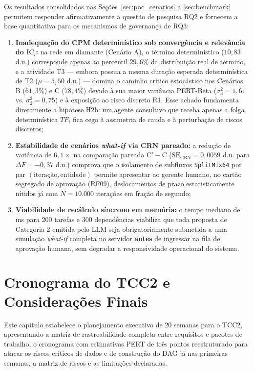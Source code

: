 \documentclass[12pt,openany,oneside,a4paper,english,brazilian,sumario=tradicional]{abntex2}
\newcommand{\IC}{\mathrm{IC}}
\begin{document}
Os resultados consolidados nas Seções~\ref{sec:poc_cenarios} a \ref{sec:benchmark} permitem responder afirmativamente à questão de pesquisa RQ2 e fornecem a base quantitativa para os mecanismos de governança de RQ3:
\begin{enumerate}
  \item \textbf{Inadequação do CPM determinístico sob convergência e relevância do $\IC_i$:} na rede em diamante (Cenário A), o término determinístico ($10{,}83$ d.u.) corresponde apenas ao percentil $29{,}6\%$ da distribuição real de término, e a atividade T3 — embora possua a mesma duração esperada determinística de T2 ($\mu=5{,}50$ d.u.) — domina o caminho crítico estocástico nos Cenários B ($61{,}3\%$) e C ($78{,}4\%$) devido à sua maior variância PERT-Beta ($\sigma_3^2 = 1{,}61$ vs. $\sigma_2^2 = 0{,}75$) e à exposição ao risco discreto R1. Esse achado fundamenta diretamente a hipótese H2b: um agente consultivo que receba apenas a folga determinística $TF_i$ fica cego à assimetria de cauda e à perturbação de riscos discretos;
  \item \textbf{Estabilidade de cenários \textit{what-if} via CRN pareado:} a redução de variância de $6{,}1\times$ na comparação pareada $\text{C}' - \text{C}$ ($\mathrm{SE}_{\mathrm{CRN}} = 0{,}0059$ d.u. para $\Delta\bar{F} = -0{,}37$ d.u.) comprova que o isolamento de subfluxos \texttt{SplitMix64} por par $(\text{iteração},\text{entidade})$ permite apresentar ao gerente humano, no cartão segregado de aprovação (RF09), deslocamentos de prazo estatisticamente nítidos já com $N=10.000$ iterações em fração de segundo;
  \item \textbf{Viabilidade de recálculo síncrono em memória:} o tempo mediano de \benchSynthWEightMedMs{} ms para 200 tarefas e 300 dependências viabiliza que toda proposta de Categoria 2 emitida pelo LLM seja obrigatoriamente submetida a uma simulação \textit{what-if} completa no servidor \textbf{antes} de ingressar na fila de aprovação humana, sem degradar a responsividade operacional do sistema.
\end{enumerate}

\chapter{Cronograma do TCC2 e Considerações Finais}\label{cap:cronograma}

Este capítulo estabelece o planejamento executivo de 20 semanas para o TCC2, apresentando a matriz de rastreabilidade completa entre requisitos e pacotes de trabalho, o cronograma com estimativas PERT de três pontos reestruturado para atacar os riscos críticos de dados e de construção do DAG já nas primeiras semanas, a matriz de riscos e as limitações declaradas.
\end{document}
